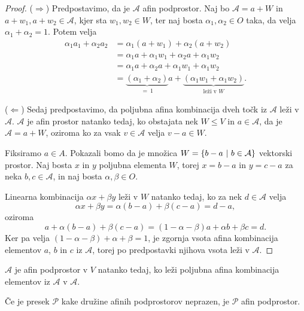 \begin{proof}
    ($\Rightarrow$)
    Predpostavimo, da je $\mathcal{A}$ afin podprostor.
    Naj bo $\mathcal{A} = a + W$ in $a + w_1, a + w_2 \in \mathcal{A}$, kjer sta $w_1, w_2 \in W$, ter naj bosta $\alpha_1, \alpha_2 \in O$ taka, da velja $\alpha_1 + \alpha_2 = 1$. Potem velja
    \begin{align*}
    \alpha_1 a_1 + \alpha_2 a_2 &= \alpha_1 (a + w_1) + \alpha_2 (a + w_2) \\
    &= \alpha_1 a + \alpha_1 w_1 + \alpha_2 a + \alpha_1 w_2 \\
    &= \alpha_1 a + \alpha_2 a + \alpha_1 w_1 + \alpha_1 w_2 \\
    &= \underbrace{(\alpha_1 + \alpha_2)}_{=\: 1} a + \underbrace{(\alpha_1 w_1 + \alpha_1 w_2)}_{\text{leži v $W$}}.
    \end{align*}

    ($\Leftarrow$)
    Sedaj predpostavimo, da poljubna afina kombinacija dveh točk iz $\mathcal{A}$ leži v $\mathcal{A}$.
    $\mathcal{A}$ je afin prostor natanko tedaj, ko obstajata nek $W \leq V$ in $a \in \mathcal{A}$, da je $\mathcal{A} = a + W$, oziroma ko za vsak $v \in \mathcal{A}$ velja $v - a \in W$.
    
    Fiksiramo $a \in A$. Pokazali bomo da je množica $W = \left\{b-a~\middle\vert~b \in \mathcal{A}\right\}$ vektorski prostor.
    Naj bosta $x$ in $y$ poljubna elementa $W$, torej $x = b - a$ in $y = c - a$ za neka $b, c \in \mathcal{A}$, in naj bosta $\alpha, \beta \in O$.
    
    Linearna kombinacija $\alpha x + \beta y$ leži v $W$ natanko tedaj, ko za nek $d \in \mathcal{A}$ velja
    \[
    \alpha x + \beta y = \alpha (b - a) + \beta (c - a) = d - a,
    \]
    oziroma
    \[
    a + \alpha (b - a) + \beta (c - a) = (1 - \alpha - \beta) a + \alpha b + \beta c = d.
    \]
    Ker pa velja $(1 - \alpha - \beta) + \alpha + \beta = 1$, je zgornja vsota afina kombinacija elementov $a$, $b$ in $c$ iz $\mathcal{A}$, torej po predpostavki njihova vsota leži v $\mathcal{A}$.
\end{proof}


\begin{posledica}
    $\mathcal{A}$ je afin podprostor v $V$ natanko tedaj, ko leži poljubna afina kombinacija elementov iz $\mathcal{A}$ v $\mathcal{A}$.
\end{posledica}

\begin{trditev}
    Če je presek $\mathcal{P}$ kake družine afinih podprostorov neprazen, je $\mathcal{P}$ afin podprostor.
\end{trditev}

